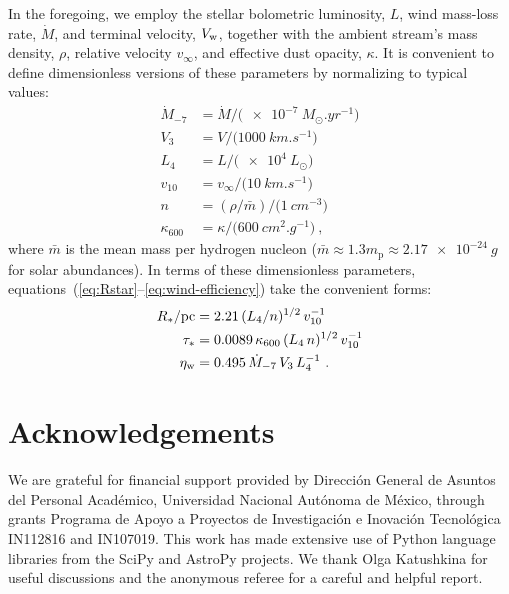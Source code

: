 \documentclass[useAMS, usenatbib, a4paper]{mnras}
\begin{document}
In the foregoing, we employ the stellar bolometric luminosity, \(L\),
wind mass-loss rate, \(\dot{M}\), and terminal velocity, \(V_{\text{w}}\),
together with the ambient stream's mass density, \(\rho\), relative
velocity \(v_\infty\), and effective dust opacity, \(\kappa\).  It is convenient
to define dimensionless versions of these parameters by normalizing to
typical values:
\begin{align*}
  \dot{M}_{-7} &= \dot{M} / \bigl(\SI{e-7}{M_\odot.yr^{-1}}\bigr) \\
  V_3 &= V / \bigl(\SI{1000}{km.s^{-1}}\bigr) \\
  L_4 &= L / \bigl(\SI{e4}{L_\odot}\bigr) \\
  v_{10} &= v_\infty / \bigl( \SI{10}{km.s^{-1}} \bigr) \\
  n &= (\rho / \bar{m}) / \bigl( \SI{1}{cm^{-3}} \bigr) \\
  \kappa_{600} &= \kappa / \bigl( \SI{600}{cm^2.g^{-1}} \bigr) \ ,
\end{align*}
where \(\bar{m}\) is the mean mass per hydrogen nucleon
(\(\bar{m} \approx 1.3 m_{\text{p}} \approx \SI{2.17e-24}{g}\) for solar
abundances).  In terms of these dimensionless parameters,
equations~(\ref{eq:Rstar}--\ref{eq:wind-efficiency}) take the
convenient forms:
\begin{align}
  \label{eq:Rstar-typical}
  R_* / \si{pc} &= \num{2.21} \, (L_4 / n)^{1/2} \,v_{10}^{-1} \\
  \label{eq:taustar-typical}
  \tau_* &= \num{0.0089} \,\kappa_{600} \, (L_4 \,n)^{1/2} \,v_{10}^{-1} \\
  \label{eq:wind-eta-typical}
  \eta\wind &= \num{0.495} \,\dot{M}_{-7} \,V_3  \,L_4^{-1} \ .
\end{align}








\section*{Acknowledgements}
We are grateful for financial support provided by Dirección General de
Asuntos del Personal Académico, Universidad Nacional Autónoma de
México, through grants Programa de Apoyo a Proyectos de Investigación
e Inovación Tecnológica IN112816 and IN107019.  This work has made
extensive use of Python language libraries from the SciPy
\citep{Jones:2001a} and AstroPy \citep{Astropy-Collaboration:2013a,
  Astropy-Collaboration:2018a} projects.  We thank Olga Katushkina for
useful discussions and the anonymous referee for a careful and
helpful report.




\appendix


\bsp	%
\label{lastpage}
\end{document}
